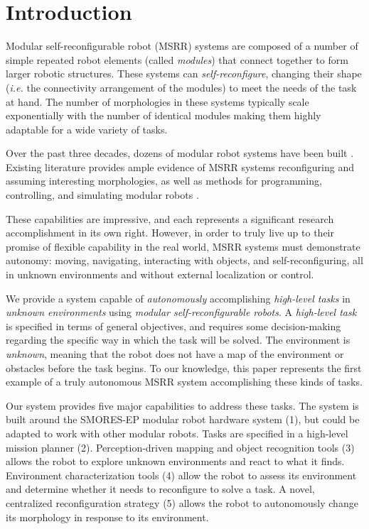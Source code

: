 \documentclass[conference]{IEEEtran}
\begin{document}
\section{Introduction} \label{sec:introduction}
%
Modular self-reconfigurable robot (MSRR) systems are composed of a number of simple repeated robot elements (called \emph{modules}) that connect together to form larger robotic structures. These systems can \emph{self-reconfigure}, changing their shape (\emph{i.e.} the connectivity arrangement of the modules) to meet the needs of the task at hand.
The number of morphologies in these systems typically scale exponentially with the number of identical modules making them highly adaptable for a wide variety of tasks. 

Over the past three decades, dozens of modular robot systems have been built \cite{Yim2007a}. Existing literature provides ample evidence of MSRR systems reconfiguring and assuming interesting morphologies, as well as methods for programming, controlling, and simulating modular robots \cite{Yim2007,Jing2016,Yim1994}.

These capabilities are impressive, and each represents a significant research accomplishment in its own right. However, in order to truly live up to their promise of flexible capability in the real world, MSRR systems must demonstrate autonomy: moving, navigating, interacting with objects, and self-reconfiguring, all in unknown environments and without external localization or control. 

We provide a system capable of \emph{autonomously} accomplishing \emph{high-level
tasks} in \emph{unknown environments} using \emph{modular self-reconfigurable
robots}.  A \emph{high-level task} is specified in terms
of general objectives, and requires some decision-making regarding the specific
way in which the task will be solved. The environment is \emph{unknown}, meaning
that the robot does not have a map of the environment or obstacles before the
task begins. To our knowledge, this paper represents the first example of a truly autonomous MSRR system accomplishing these kinds of tasks.


Our system provides five major capabilities to address these tasks.  The system is built around the SMORES-EP modular robot hardware system (1), but could be adapted to work with other modular robots. Tasks are specified in a high-level mission planner (2).  Perception-driven mapping and object recognition tools (3) allows the robot to explore unknown environments and react to what it finds. Environment characterization tools (4) allow the robot to assess its environment and determine whether it needs to reconfigure to solve a task.  A novel, centralized reconfiguration strategy (5) allows the robot to autonomously change its morphology in response to its environment.
\end{document}

